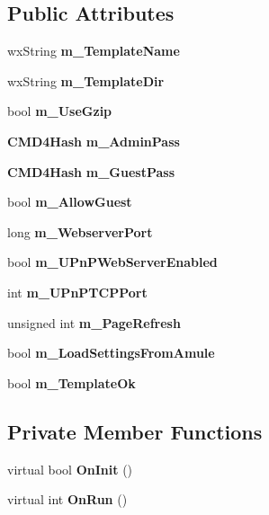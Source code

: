 \subsection*{Public Attributes}
\begin{DoxyCompactItemize}
\item 
wxString {\bfseries m\_\-TemplateName}\label{classCamulewebApp_a9435f3e5c4ee5190f1e380b3641f2c17}

\item 
wxString {\bfseries m\_\-TemplateDir}\label{classCamulewebApp_a4885dfcce0dc23d5a35cbc891fc77bff}

\item 
bool {\bfseries m\_\-UseGzip}\label{classCamulewebApp_a6b6999689f4c531e568b0a48cdbdcb27}

\item 
{\bf CMD4Hash} {\bfseries m\_\-AdminPass}\label{classCamulewebApp_a44ad5304a9c298974fa7667c26b91d09}

\item 
{\bf CMD4Hash} {\bfseries m\_\-GuestPass}\label{classCamulewebApp_ab786af7533e6974456fba28ff226180b}

\item 
bool {\bfseries m\_\-AllowGuest}\label{classCamulewebApp_a5bc42ec2f6cc69969fcf0979d416e9f0}

\item 
long {\bfseries m\_\-WebserverPort}\label{classCamulewebApp_aee657713cdf2ae5fb1efa716a92b7c98}

\item 
bool {\bfseries m\_\-UPnPWebServerEnabled}\label{classCamulewebApp_a65a500d8bd0f89df146b4fd2537c515e}

\item 
int {\bfseries m\_\-UPnPTCPPort}\label{classCamulewebApp_acb756b3462104d829a03451dc5f380fb}

\item 
unsigned int {\bfseries m\_\-PageRefresh}\label{classCamulewebApp_a3d16c05595d34933956fcfb052a11250}

\item 
bool {\bfseries m\_\-LoadSettingsFromAmule}\label{classCamulewebApp_a757a2dac2dca625b6891e6123c4707ed}

\item 
bool {\bfseries m\_\-TemplateOk}\label{classCamulewebApp_ae71ab2fd145f133528613143044dc89b}

\end{DoxyCompactItemize}
\subsection*{Private Member Functions}
\begin{DoxyCompactItemize}
\item 
virtual bool {\bfseries OnInit} ()\label{classCamulewebApp_afcae1f60bd6659726d8b901b0af798fa}

\item 
virtual int {\bfseries OnRun} ()\label{classCamulewebApp_a1d82ea6430bb28a908a5c786557e8598}

\end{DoxyCompactItemize}
